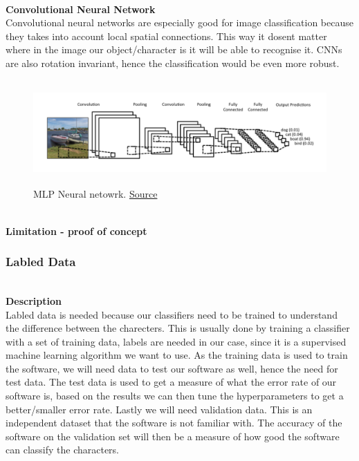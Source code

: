 \documentclass[11pt,a4paper,english]{article}
\begin{document}
\noindent \\ \textbf{Convolutional Neural Network}
\noindent \\ Convolutional neural networks are especially good for image
classification because they takes into account local spatial connections. This
way it dosent matter where in the image our object/character is it will be
able to recognise it. CNNs are also rotation invariant, hence the
classification would be even more robust.


\begin{figure}[H]
  \centering
  \includegraphics[height=4cm]{res/CNN_architecture.png}
  \caption{MLP Neural netowrk. \href{ http://www.wildml.com/2015/11/understanding-convolutional-neural-networks-for-nlp/}{Source}}
  \label{fig:CNN_architecture}
\end{figure}

\noindent \\ \textbf{Limitation - proof of concept}

\subsubsection{Labled Data}
\noindent \\ \textbf{Description}
\noindent \\
Labled data is needed because our classifiers need to be trained to understand
the difference between the charecters. This is usually done by training a
classifier with a set of training data, labels are needed in our case,
since it is a supervised machine learning algorithm we want to use. As the
training data is used to train the software, we will need data to test our
software as well, hence the need for test data. The test data is used to get a
measure of what the error rate of our software is, based on the results we
can then tune the hyperparameters to get a better/smaller error rate. Lastly
we will need validation data. This is an independent dataset that the software
is not familiar with. The accuracy of the software on the validation set will
then be a measure of how good the software can classify the characters.
\end{document}
